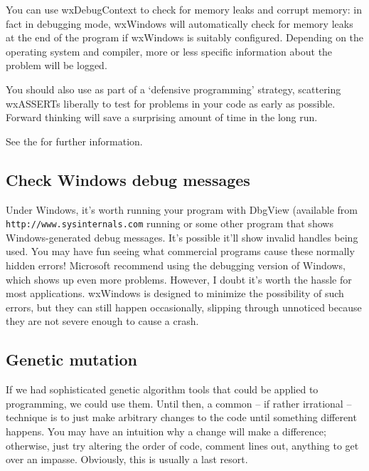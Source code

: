 You can use wxDebugContext to check for
memory leaks and corrupt memory: in fact in debugging mode, wxWindows will
automatically check for memory leaks at the end of the program if wxWindows is suitably
configured. Depending on the operating system and compiler, more or less
specific information about the problem will be logged.

You should also use  as part of a `defensive programming' strategy,
scattering wxASSERTs liberally to test for problems in your code as early as possible. Forward thinking
will save a surprising amount of time in the long run.

See the  for further information.

\subsection{Check Windows debug messages}

Under Windows, it's worth running your program with DbgView (available from
{\tt http://www.sysinternals.com} running or
some other program that shows Windows-generated debug messages. It's
possible it'll show invalid handles being used. You may have fun seeing
what commercial programs cause these normally hidden errors! Microsoft
recommend using the debugging version of Windows, which shows up even
more problems. However, I doubt it's worth the hassle for most
applications. wxWindows is designed to minimize the possibility of such
errors, but they can still happen occasionally, slipping through unnoticed
because they are not severe enough to cause a crash.

\subsection{Genetic mutation}

If we had sophisticated genetic algorithm tools that could be applied
to programming, we could use them. Until then, a common -- if rather irrational --
technique is to just make arbitrary changes to the code until something
different happens. You may have an intuition why a change will make a difference;
otherwise, just try altering the order of code, comment lines out, anything
to get over an impasse. Obviously, this is usually a last resort.

